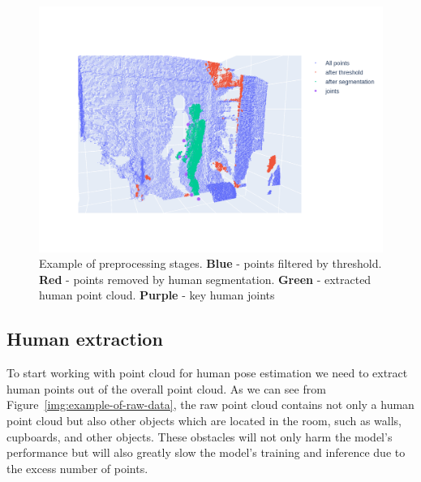 \begin{figure}[htbp]
    \hspace*{-1cm}                                                           
        \includegraphics[trim=0 200 450 200,clip,scale=0.25]{Figures/example-all-parts.png}
    \caption{Example of preprocessing stages. \textbf{Blue} - points filtered by threshold. \textbf{Red} - points removed by human segmentation. \textbf{Green} - extracted human point cloud. \textbf{Purple} - key human joints}
    \label{img:example-of-all-parts}
\end{figure}

\subsection{Human extraction}
To start working with point cloud for human pose estimation we need to extract human points out of the overall point cloud. As we can see from Figure~\ref{img:example-of-raw-data}, the raw point cloud contains not only a human point cloud but also other objects which are located in the room, such as walls, cupboards, and other objects. These obstacles will not only harm the model's performance but will also greatly slow the model's training and inference due to the excess number of points.

